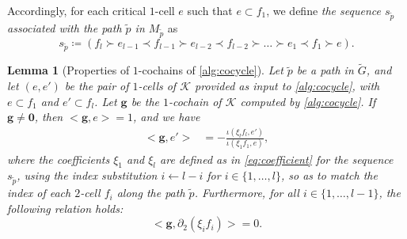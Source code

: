 \documentclass[a4paper,twoside,10pt]{article}
\theoremstyle{plain}
\newtheorem{lemma}{Lemma}
\theoremstyle{definition}
\theoremstyle{remark}
\newcommand{\mc}{\mathcal}
\newcommand{\K}{\mc{K}}
\newcommand{\inner}[2]{< #1,#2>}
\newcommand{\cochain}[1]{\mathbf #1}
\newcommand{\dual}[1]{\tilde{#1}}
\begin{document}
Accordingly, for each critical $1$-cell $e$ such that $e \subset f_1$, we define \emph{the sequence $s_{\dual{p}}$ associated with the path $\dual{p}$ in $M_{\dual{p}}$} as  
\begin{equation*}
s_{\dual{p}} \coloneqq (f_l \succ e_{l-1} \prec f_{l-1} \succ e_{l-2} \prec f_{l-2} \succ \dots \succ e_1 \prec f_1 \succ e).
\end{equation*}


\begin{lemma}[Properties of $1$-cochains of \cref{alg:cocycle}]
\label{lem:cocycle} 
Let $\dual p$ be a path in $\dual G$, and let $(e,e')$ be the pair of $1$-cells of $\K$ provided as input to \cref{alg:cocycle}, with $e \subset f_1$ and $e' \subset f_l$.
Let $\cochain g$ be the $1$-cochain of $\K$ computed by \cref{alg:cocycle}.
If $\cochain g \neq \cochain 0$, then $\inner{\cochain g}{e} = 1$, and we have
\begin{align}
\inner{\cochain g}{e'} &= -\frac{\iota(\xi_l f_l, e')}{\iota(\xi_1 f_1, e)},
\label{eq:transformation}
\end{align}
where the coefficients $\xi_1$ and $\xi_l$ are defined as in \cref{eq:coefficient} for the sequence $s_{\dual p}$, using the index substitution $i \leftarrow l-i$ for $i \in \{1, \dots, l\}$, so as to match the index of each $2$-cell $f_i$ along the path $\dual p$.
Furthermore, for all $i \in \{1, \dots, l-1\}$, the following relation holds:
\begin{equation}
\inner{\cochain g}{\partial_2(\xi_i f_i)} = 0.
\label{eq:cocycle.face}
\end{equation}
\end{lemma}
\end{document}
